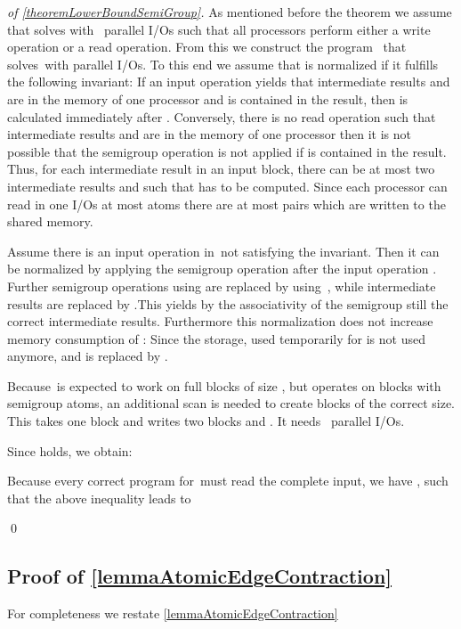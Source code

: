 \documentclass[envcountsame]{llncs}
\begin{document}
\begin{proof}[of \autoref{theoremLowerBoundSemiGroup}]
As mentioned before the theorem we assume that \progSE solves \instSE \linebreak with~\mbox{\tSE} parallel I/Os such that all processors perform either a write operation or a read operation.
From this we construct the program~\progPN{} that solves~\instPN with  parallel I/Os. 
To this end we assume that \progSE is normalized if it fulfills the following invariant: 
If an input operation  yields that intermediate results  and  are in the memory of one processor and  is contained in the result, then  is calculated immediately after .
Conversely, there is no read operation  such that intermediate results  and  are in the memory of one processor then it is not possible that the semigroup operation is not applied if  is contained in the result.
Thus, for each intermediate result  in an input block, there can be at most two intermediate results  and  such that  has to be computed. Since each processor can read in one I/Os at most \BSE atoms there are at most  pairs which are written to the shared memory. 


Assume there is an input operation in~\progSE not satisfying the invariant. 
Then it can be normalized by applying the semigroup operation  after the input operation .
Further semigroup operations using  are replaced by using~, while intermediate results  are replaced by .This yields by the associativity of the semigroup still the correct intermediate results. Furthermore this normalization does not increase memory consumption of \progSE:
Since the storage, used temporarily for  is not used anymore, and  is replaced by . 

Because~\progPN is expected to work on full blocks of size \BPN, but \progSE operates on blocks with \BSE semigroup atoms, an additional scan is needed to create blocks of the correct size.
This takes one block  and writes two blocks  and . 
It needs~ parallel I/Os.

Since  holds, we obtain:

Because every correct program for~\tSE must read the complete input, we have , such that the above inequality leads to 

\qed\end{proof}

\subsection{Proof of \autoref{lemmaAtomicEdgeContraction}}\label{appendixAtomicEdgeContraction}

For completeness we restate \autoref{lemmaAtomicEdgeContraction}
\end{document}
